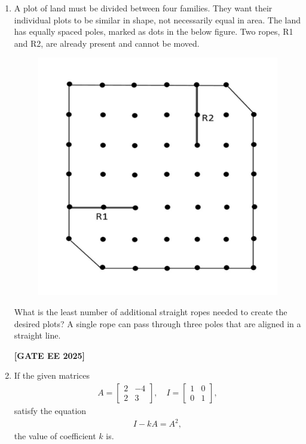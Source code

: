 \documentclass[journal]{IEEEtran}
\newcommand{\qfooter}{%
  \begin{flushright}\footnotesize\textbf{[GATE EE 2025]}\end{flushright}\vspace{1em}%
}
\begin{document}
\begin{enumerate}
\item A plot of land must be divided between four families. They want their individual plots to be similar in shape, not necessarily equal in area. The land has equally spaced poles, marked as dots in the below figure. Two ropes, R1 and R2, are already present and cannot be moved.

\begin{figure}[h]
\centering
\includegraphics[width=0.5\columnwidth]{figs/q10.png}
\end{figure}
\newpage
What is the least number of additional straight ropes needed to create the desired plots? A single rope can pass through three poles that are aligned in a straight line.
\begin{enumerate}
\qfooter
\end{enumerate}


\item If the given matrices
\begin{align}
A = \begin{bmatrix} 2 & -4 \\ 2 & 3 \end{bmatrix}, \quad
I = \begin{bmatrix} 1 & 0 \\ 0 & 1 \end{bmatrix},
\end{align}
satisfy the equation
\begin{align}
I - kA = A^2,
\end{align}
the value of coefficient \(k\) is\underline{\hspace{2cm}}.


\end{enumerate}
\end{document}
